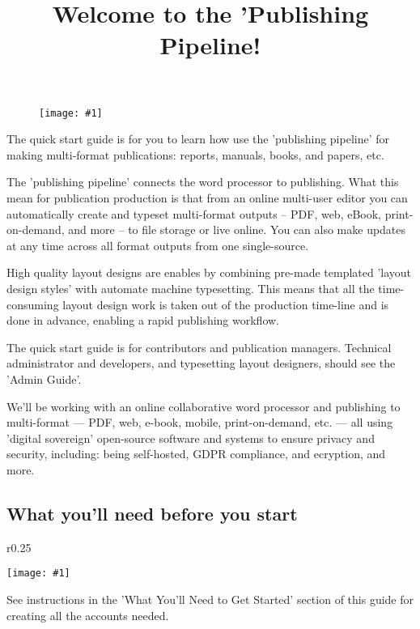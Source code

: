 \documentclass{article}
\newlength{\imgwidth}
\newcommand\scaledgraphics[2]{%
                
\settowidth{\imgwidth}{\texttt{[image: \#1]}}%
                
\setlength{\imgwidth}{\minof{\imgwidth}{#2\textwidth}}%
                
\texttt{[image: \#1]}%
                
}
\begin{document}
\title{Welcome to the 'Publishing Pipeline!}

\maketitle

\begin{figure}
\scaledgraphics{b3bc6ba5-db38-4ec8-89db-45c029fdb485.png}{0.75}
\label{F98934631}
\end{figure}


The quick start guide is for you to learn how use the 'publishing pipeline' for making multi-format publications: reports, manuals, books, and papers, etc.


The 'publishing pipeline' connects the word processor to publishing. What this mean for publication production is that from an online multi-user editor you can automatically create and typeset multi-format outputs – PDF, web, eBook, print-on-demand, and more – to file storage or live online. You can also make updates at any time across all format outputs from one single-source. 


High quality layout designs are enables by combining pre-made templated 'layout design styles' with automate machine typesetting. This means that all the time-consuming layout design work is taken out of the production time-line and is done in advance, enabling a rapid publishing workflow.


The quick start guide is for contributors and publication managers. Technical administrator and developers, and typesetting layout designers, should see the 'Admin Guide'.


We'll be working with an online collaborative word processor and publishing to multi-format — PDF, web, e-book, mobile, print-on-demand, etc. — all using 'digital sovereign' open-source software and systems to ensure privacy and security, including: being self-hosted, GDPR compliance, and ecryption, and more.


\subsection{What you'll need before you start}\label{H4632171}


\begin{wrapfigure}{r}{0.25\textwidth}
\scaledgraphics{fec439eb-c4d6-4587-a4a2-affde7c45586.png}{0.25}
\label{F18710661}
\end{wrapfigure}


See instructions in the 'What You'll Need to Get Started' section of this guide for creating all the accounts needed.
\end{document}
